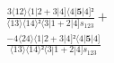 \documentclass[varwidth, border=5pt]{standalone}
\begin{document}
\begin{my}
$\begin{gathered}
\scriptscriptstyle\frac{3⟨12⟩⟨1|2+3|4]⟨4|𝟓|4]²}{⟨13⟩⟨14⟩²⟨3|1+2|4]s_{123}} +\\
\scriptscriptstyle\frac{-4⟨24⟩⟨1|2+3|4]²⟨4|𝟓|4]}{⟨13⟩⟨14⟩²⟨3|1+2|4]s_{123}} \phantom{+}
\end{gathered}$
\end{my}
\end{document}
